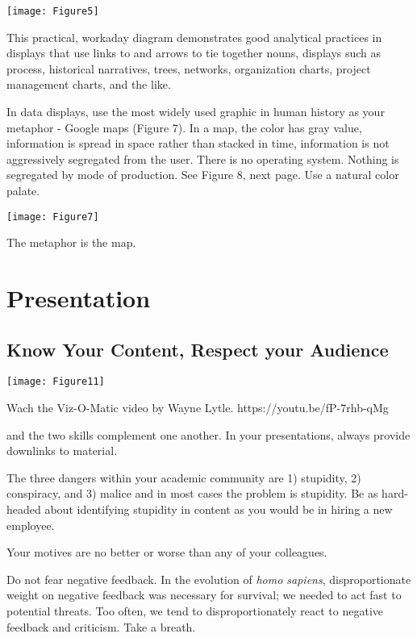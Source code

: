 \documentclass{tufte-handout}
\begin{document}
\begin{marginfigure}
\texttt{[image: Figure5]}
\caption{This practical, workaday diagram demonstrates good analytical practices in displays that use links to and arrows to tie together nouns, displays such as process, historical narratives, trees, networks, organization charts, project management charts, and the like.}
\end{marginfigure}


In data displays, use the most widely used graphic in human history as your metaphor - Google maps (Figure 7).  In a map, the color has gray value, information is spread in space rather than stacked in time, information is not aggressively segregated from the user. There is no operating system. Nothing is segregated by mode of production. See Figure 8, next page. Use a natural color palate.




\begin{marginfigure}
\texttt{[image: Figure7]}
\caption{The metaphor is the map.}
\end{marginfigure}


\section{Presentation}

\subsection{Know Your Content, Respect your Audience}


\begin{marginfigure}
\texttt{[image: Figure11]}
\caption{Wach the Viz-O-Matic video by Wayne Lytle. https://youtu.be/fP-7rhb-qMg}
\end{marginfigure}

 and the two skills complement one another.  In your presentations, always provide downlinks to material.  

The three dangers within your academic community are 1) stupidity, 2) conspiracy, and 3) malice and in most cases the problem is stupidity.  Be as hard-headed about identifying stupidity in content as you would be in hiring a new employee. 


Your motives are no better or worse than any of your colleagues.



Do not fear negative feedback.  In the evolution of \textit{homo sapiens}, disproportionate weight on negative feedback was necessary for survival; we needed to act fast to potential threats. Too often, we tend to disproportionately react to negative feedback and criticism.  Take a breath.  
\end{document}
